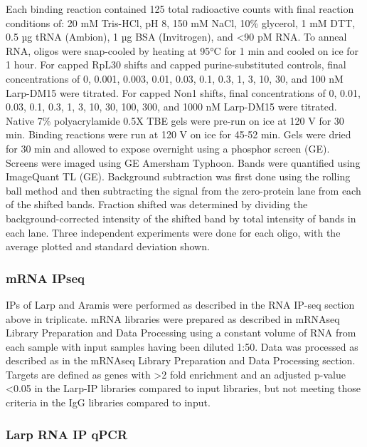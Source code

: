 \documentclass[12pt,oneside]{reedthesis}
\begin{document}
Each binding reaction contained 125 total radioactive counts with final reaction conditions of: 20 mM Tris-HCl, pH 8, 150 mM NaCl, 10\% glycerol, 1 mM DTT, 0.5 µg tRNA (Ambion), 1 µg BSA (Invitrogen), and \textless90 pM RNA. To anneal RNA, oligos were snap-cooled by heating at 95°C for 1 min and cooled on ice for 1 hour. For capped RpL30 shifts and capped purine-substituted controls, final concentrations of 0, 0.001, 0.003, 0.01, 0.03, 0.1, 0.3, 1, 3, 10, 30, and 100 nM Larp-DM15 were titrated. For capped Non1 shifts, final concentrations of 0, 0.01, 0.03, 0.1, 0.3, 1, 3, 10, 30, 100, 300, and 1000 nM Larp-DM15 were titrated. Native 7\% polyacrylamide 0.5X TBE gels were pre-run on ice at 120 V for 30 min. Binding reactions were run at 120 V on ice for 45-52 min. Gels were dried for 30 min and allowed to expose overnight using a phosphor screen (GE). Screens were imaged using GE Amersham Typhoon. Bands were quantified using ImageQuant TL (GE). Background subtraction was first done using the rolling ball method and then subtracting the signal from the zero-protein lane from each of the shifted bands. Fraction shifted was determined by dividing the background-corrected intensity of the shifted band by total intensity of bands in each lane. Three independent experiments were done for each oligo, with the average plotted and standard deviation shown.

\hypertarget{mrna-ipseq}{%
\subsubsection{mRNA IPseq}\label{mrna-ipseq}}

IPs of Larp and Aramis were performed as described in the RNA IP-seq section above in triplicate. mRNA libraries were prepared as described in mRNAseq Library Preparation and Data Processing using a constant volume of RNA from each sample with input samples having been diluted 1:50. Data was processed as described as in the mRNAseq Library Preparation and Data Processing section. Targets are defined as genes with \textgreater2 fold enrichment and an adjusted p-value \textless0.05 in the Larp-IP libraries compared to input libraries, but not meeting those criteria in the IgG libraries compared to input.

\hypertarget{larp-rna-ip-qpcr}{%
\subsubsection{Larp RNA IP qPCR}\label{larp-rna-ip-qpcr}}
\end{document}
